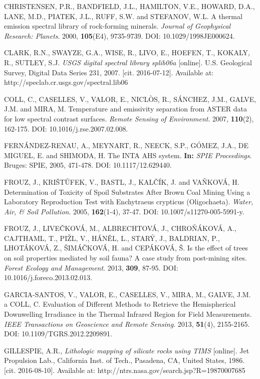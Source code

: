 \begin{thebibliography}{10}
 CHRISTENSEN, P.R., BANDFIELD, J.L., HAMILTON, V.E., HOWARD, D.A., LANE, M.D., PIATEK, J.L., RUFF, S.W. and STEFANOV, W.L. A thermal emission spectral library of rock-forming minerals. \textit{Journal of Geophysical Research: Planets}. 2000, \textbf{105}(E4), 9735-9739. DOI: 10.1029/1998JE000624.

 CLARK, R.N., SWAYZE, G.A., WISE, R., LIVO, E., HOEFEN, T., KOKALY, R., SUTLEY, S.J. \textit{USGS digital spectral library splib06a} [online]. U.S. Geological Survey, Digital Data Series 231, 2007. [cit. 2016-07-12]. Available at: http://speclab.cr.usgs.gov/spectral.lib06

 COLL, C., CASELLES, V., VALOR, E., NICLÒS, R., SÁNCHEZ, J.M., GALVE, J.M. and MIRA, M. Temperature and emissivity separation from ASTER data for low spectral contrast surfaces. \textit{Remote Sensing of Environment}. 2007, \textbf{110}(2), 162-175. DOI: 10.1016/j.rse.2007.02.008. 

 FERNÁNDEZ-RENAU, A., MEYNART, R., NEECK, S.P., GÓMEZ, J.A., DE MIGUEL, E. and SHIMODA, H. The INTA AHS system. \textbf{In:} \textit{SPIE Proceedings}. Bruges: SPIE, 2005, 471-478. DOI: 10.1117/12.629440.

 FROUZ, J., KRIŠTŮFEK, V., BASTL, J., KALČÍK, J. and VAŇKOVÁ, H. Determination of Toxicity of Spoil Substrates After Brown Coal Mining Using a Laboratory Reproduction Test with Enchytraeus crypticus (Oligochaeta). \textit{Water, Air, \& Soil Pollution}. 2005, \textbf{162}(1-4), 37-47. DOI: 10.1007/s11270-005-5991-y. 

 FROUZ, J., LIVEČKOVÁ, M., ALBRECHTOVÁ, J., CHROŇÁKOVÁ, A., CAJTHAML, T., PIŽL, V., HÁNĚL, L., STARÝ, J., BALDRIAN, P., LHOTÁKOVÁ, Z., ŠIMÁČKOVÁ, H. and CEPÁKOVÁ, Š. Is the effect of trees on soil properties mediated by soil fauna? A case study from post-mining sites. \textit{Forest Ecology and Management}. 2013, \textbf{309}, 87-95. DOI: 10.1016/j.foreco.2013.02.013.

 GARCIA-SANTOS, V., VALOR, E., CASELLES, V., MIRA, M., GALVE, J.M. a COLL, C. Evaluation of Different Methods to Retrieve the Hemispherical Downwelling Irradiance in the Thermal Infrared Region for Field Measurements. \textit{IEEE Transactions on Geoscience and Remote Sensing}. 2013, \textbf{51}(4), 2155-2165. DOI: 10.1109/TGRS.2012.2209891.

 GILLESPIE, A.R., \textit{Lithologic mapping of silicate rocks using TIMS} [online]. Jet Propulsion Lab., California Inst. of Tech., Pasadena, CA, United States, 1986. [cit. 2016-08-10]. Available at: http://ntrs.nasa.gov/search.jsp?R=19870007685


\end{thebibliography}
